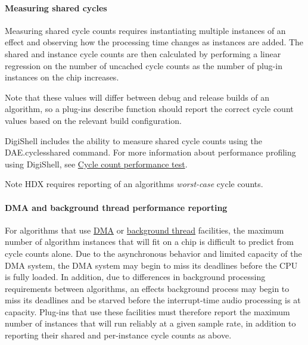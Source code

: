 \hypertarget{a00362_subsubsection__measuring_shared_cycles_}{}\paragraph{Measuring shared cycles}\label{a00362_subsubsection__measuring_shared_cycles_}
 Measuring shared cycle counts requires instantiating multiple instances of an effect and observing how the processing time changes as instances are added. The shared and instance cycle counts are then calculated by performing a linear regression on the number of uncached cycle counts as the number of plug-\/in instances on the chip increases.

Note that these values will differ between debug and release builds of an algorithm, so a plug-\/in\textquotesingle{}s describe function should report the correct cycle count values based on the relevant build configuration.

Digi\+Shell includes the ability to measure shared cycle counts using the {\ttfamily D\+A\+E.\+cyclesshared} command. For more information about performance profiling using Digi\+Shell, see \hyperlink{a00365_subsection__cyclessharedtest}{Cycle count performance test}.

\begin{DoxyNote}{Note}
H\+D\+X requires reporting of an algorithm\textquotesingle{}s {\itshape worst-\/case} cycle counts.
\end{DoxyNote}
\hypertarget{a00362_subsubsection__dma_and_background_thread_performance_reporting_}{}\paragraph{D\+M\+A and background thread performance reporting}\label{a00362_subsubsection__dma_and_background_thread_performance_reporting_}
 For algorithms that use \hyperlink{a00340}{D\+M\+A} or \hyperlink{a00341}{background thread} facilities, the maximum number of algorithm instances that will fit on a chip is difficult to predict from cycle counts alone. Due to the asynchronous behavior and limited capacity of the D\+M\+A system, the D\+M\+A system may begin to miss its deadlines before the C\+P\+U is fully loaded. In addition, due to differences in background processing requirements between algorithms, an effect\textquotesingle{}s background process may begin to miss its deadlines and be starved before the interrupt-\/time audio processing is at capacity. Plug-\/ins that use these facilities must therefore report the maximum number of instances that will run reliably at a given sample rate, in addition to reporting their shared and per-\/instance cycle counts as above.

